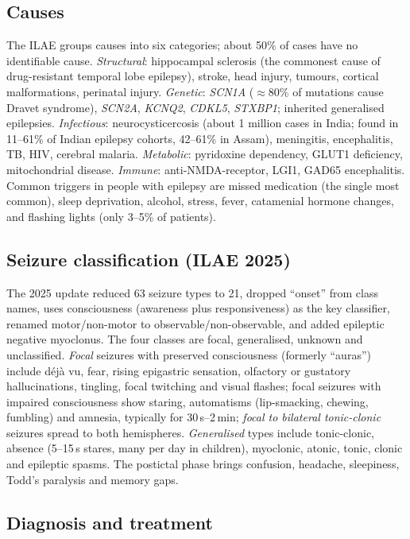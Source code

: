 \subsection{Causes}

The ILAE groups causes into six categories; about 50\% of cases have no identifiable cause. \emph{Structural}: hippocampal sclerosis (the commonest cause of drug-resistant temporal lobe epilepsy), stroke, head injury, tumours, cortical malformations, perinatal injury. \emph{Genetic}: \textit{SCN1A} ($\approx$80\% of mutations cause Dravet syndrome), \textit{SCN2A}, \textit{KCNQ2}, \textit{CDKL5}, \textit{STXBP1}; inherited generalised epilepsies. \emph{Infectious}: neurocysticercosis (about 1 million cases in India; found in 11--61\% of Indian epilepsy cohorts, 42--61\% in Assam), meningitis, encephalitis, TB, HIV, cerebral malaria. \emph{Metabolic}: pyridoxine dependency, GLUT1 deficiency, mitochondrial disease. \emph{Immune}: anti-NMDA-receptor, LGI1, GAD65 encephalitis. Common triggers in people with epilepsy are missed medication (the single most common), sleep deprivation, alcohol, stress, fever, catamenial hormone changes, and flashing lights (only 3--5\% of patients).

\subsection{Seizure classification (ILAE 2025)}

The 2025 update reduced 63 seizure types to 21, dropped ``onset'' from class names, uses consciousness (awareness plus responsiveness) as the key classifier, renamed motor/non-motor to observable/non-observable, and added epileptic negative myoclonus. The four classes are focal, generalised, unknown and unclassified. \emph{Focal} seizures with preserved consciousness (formerly ``auras'') include déjà vu, fear, rising epigastric sensation, olfactory or gustatory hallucinations, tingling, focal twitching and visual flashes; focal seizures with impaired consciousness show staring, automatisms (lip-smacking, chewing, fumbling) and amnesia, typically for 30\,s--2\,min; \emph{focal to bilateral tonic-clonic} seizures spread to both hemispheres. \emph{Generalised} types include tonic-clonic, absence (5--15\,s stares, many per day in children), myoclonic, atonic, tonic, clonic and epileptic spasms. The postictal phase brings confusion, headache, sleepiness, Todd's paralysis and memory gaps.

\subsection{Diagnosis and treatment}

